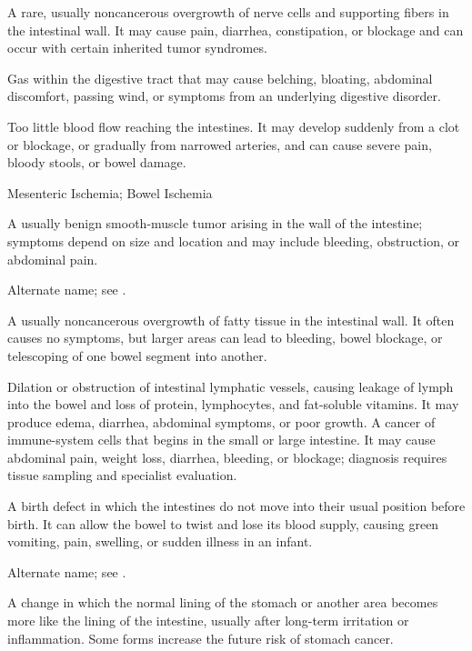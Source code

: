  A rare, usually noncancerous overgrowth of nerve cells and supporting fibers in the intestinal wall. It may cause pain, diarrhea, constipation, or blockage and can occur with certain inherited tumor syndromes.

 Gas within the digestive tract that may cause belching, bloating, abdominal discomfort, passing wind, or symptoms from an underlying digestive disorder.

 Too little blood flow reaching the intestines. It may develop suddenly from a clot or blockage, or gradually from narrowed arteries, and can cause severe pain, bloody stools, or bowel damage.

\synonyms
Mesenteric Ischemia; Bowel Ischemia

 A usually benign smooth-muscle tumor arising in the wall of the intestine; symptoms depend on size and location and may include bleeding, obstruction, or abdominal pain.

 Alternate name; see .

 A usually noncancerous overgrowth of fatty tissue in the intestinal wall. It often causes no symptoms, but larger areas can lead to bleeding, bowel blockage, or telescoping of one bowel segment into another.

 Dilation or obstruction of intestinal lymphatic vessels, causing leakage of lymph into the bowel and loss of protein, lymphocytes, and fat-soluble vitamins. It may produce edema, diarrhea, abdominal symptoms, or poor growth.
 A cancer of immune-system cells that begins in the small or large intestine. It may cause abdominal pain, weight loss, diarrhea, bleeding, or blockage; diagnosis requires tissue sampling and specialist evaluation.

 A birth defect in which the intestines do not move into their usual position before birth. It can allow the bowel to twist and lose its blood supply, causing green vomiting, pain, swelling, or sudden illness in an infant.

 Alternate name; see .

 A change in which the normal lining of the stomach or another area becomes more like the lining of the intestine, usually after long-term irritation or inflammation. Some forms increase the future risk of stomach cancer.

